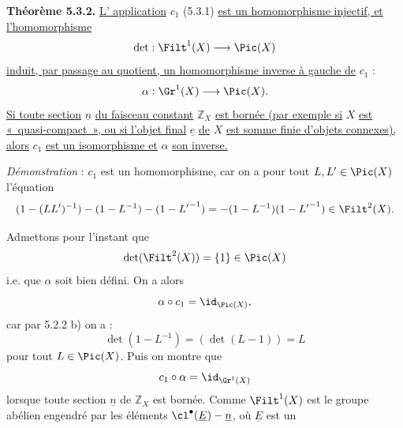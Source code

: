
\textbf{Théorème 5.3.2.} \uline{L'%
application} \(c_1\) (5.3.1) \uline{est un homomorphisme injectif, et l'homomorphisme}
\[
 \det:\Filt^1(X)\longrightarrow\Pic(X)
\]
\uline{induit, par passage au quotient, un homomorphisme inverse à gauche de} \(c_1\) :
\[
 \alpha:\Gr^1(X)\longrightarrow\Pic(X).
\]
\uline{Si toute section} \(\underline{n}\) \uline{du faisceau constant} \(\mathbb Z_X\) \uline{est bornée (par exemple si} \(X\) \uline{est «~quasi-compact~», ou si l'objet final} \(\underline{e}\) \uline{de} \(X\) \uline{est somme finie d'objets connexes), alors} \(c_1\) \uline{est un isomorphisme et} \(\alpha\) \uline{son inverse.}

\emph{Démonstration} : \(c_1\) est un homomorphisme, car on a pour tout \(L,L'\in\Pic(X)\) l'équation
\[
 (1-(LL')^{-1})-(1-L^{-1})-(1-{L'}^{-1})
 =
 -(1-L^{-1})(1-{L'}^{-1})\in\Filt^2(X).
\]

Admettons pour l'instant que
\[
 \det(\Filt^2(X))=\{1\}\in\Pic(X)
\]
i.e. que \(\alpha\) soit bien défini. On a alors
\[
 \alpha\circ c_1=\id_{\Pic(X)},
\]
car par 5.2.2 b) on a :
\[
 \det(1-L^{-1})=(\det(L-1))=L
\]
pour tout \(L\in\Pic(X)\). Puis on montre que
\[
 c_1\circ\alpha=\id_{\Gr^1(X)}
\]
lorsque toute section \(\underline{n}\) de \(\mathbb Z_X\) est bornée. Comme \(\Filt^1(X)\) est le groupe abélien engendré par les éléments \(\cl^{\bullet}(\underline{E})-\underline{n}\), où \(\underline{E}\) est un
